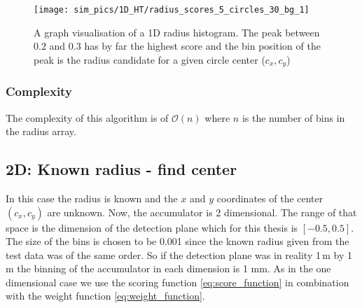 \documentclass[11pt,twoside]{scrreprt}
\begin{document}
\begin{figure}[tb]
  \centering
  \texttt{[image: sim\_pics/1D\_HT/radius\_scores\_5\_circles\_30\_bg\_1]}
  \caption[Graph visualisation of a 1D radius histogram]{A graph visualisation of a 1D radius histogram. The peak between $0.2$ 
  and $0.3$ has by far the highest score and the bin
  position of the peak is the radius candidate for a given circle center ($c_x, c_y$)}
  \label{fig:1d_ht_radius_score}
\end{figure}

\subsubsection{Complexity} %
The complexity of this algorithm is of $\mathcal{O}(n)$ where $n$ is the number of bins in the radius array.
\label{ssub:complexity_1d}


\subsection{2D: Known radius - find center} %
\label{sub:2d_known_radius_find_center}
In this case the radius is known and the $x$ and $y$ coordinates of the center $(c_x, c_y)$ are unknown. Now, the accumulator is 2 
dimensional. The range of that space is the dimension of the detection plane which for this thesis is $[-0.5,0.5]$. The size of the 
bins is chosen to be 0.001 since the known radius given from the test data was of the same order. So if the detection plane was in 
reality 1\,m by 1\,m the binning of the accumulator in each dimension is 1 mm. As in the one dimensional case we use the scoring function 
\ref{eq:score_function} in combination with the weight function \ref{eq:weight_function}.
\end{document}
